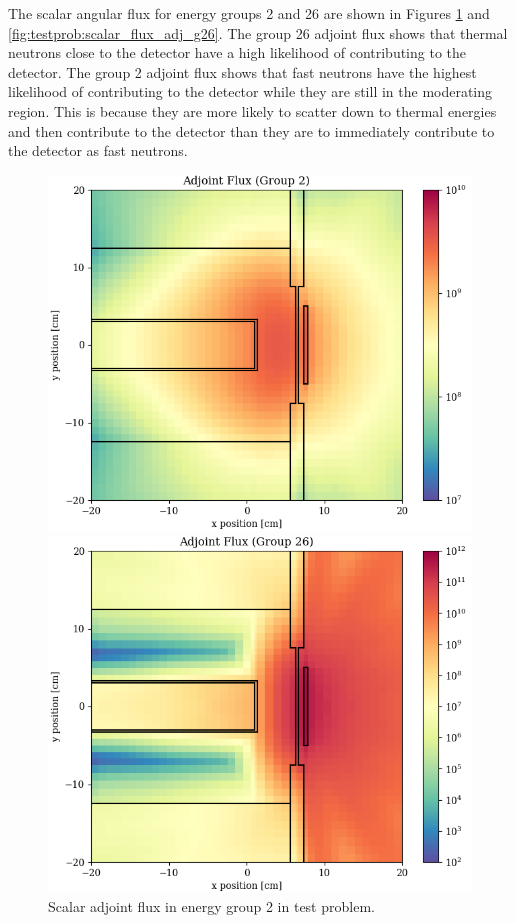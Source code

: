 The scalar angular flux for energy groups 2 and 26 are shown in Figures \ref{fig:testprob:scalar_flux_adj_g02} and \ref{fig:testprob:scalar_flux_adj_g26}.
The group 26 adjoint flux shows that thermal neutrons close to the detector have a high likelihood of contributing to the detector.
The group 2 adjoint flux shows that fast neutrons have the highest likelihood of contributing to the detector while they are still in the moderating region.
This is because they are more likely to scatter down to thermal energies and then contribute to the detector than they are to immediately contribute to the detector as fast neutrons.

\begin{figure}
  \begin{minipage}{0.49\linewidth}
    \centering
    \includegraphics[width=\linewidth]{content/testprob/scalar_flux_adj_g02.png}
    \caption{Scalar adjoint flux in energy group 2 in test problem.}
    \label{fig:testprob:scalar_flux_adj_g02}
  \end{minipage}
  \hfill
  \begin{minipage}{0.49\linewidth}
    \centering
    \includegraphics[width=\linewidth]{content/testprob/scalar_flux_adj_g26.png}

\end{minipage}
\end{figure}
